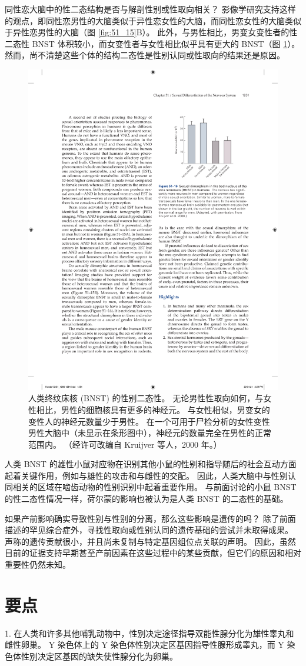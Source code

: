 同性恋大脑中的性二态结构是否与解剖性别或性取向相关？
影像学研究支持这样的观点，即同性恋男性的大脑类似于异性恋女性的大脑，而同性恋女性的大脑类似于异性恋男性的大脑（图 \ref{fig:51_15}B）。
此外，与男性相比，男变女变性者的性二态性 BNST 体积较小，而女变性者与女性相比似乎具有更大的 BNST（图 \ref{fig:51_16}）。
然而，尚不清楚这些个体的结构二态性是性别认同或性取向的结果还是原因。


\begin{figure}[htbp]
	\centering
	\includegraphics[width=0.4\linewidth]{chap51/fig_51_16}
	\caption{人类终纹床核 (BNST) 的性别二态性。 无论男性性取向如何，与女性相比，男性的细胞核具有更多的神经元。 与女性相似，男变女的变性人的神经元数量少于男性。 在一个可用于尸检分析的女性变性男性大脑中（未显示在条形图中），神经元的数量完全在男性的正常范围内。 （经许可改编自 Kruijver 等人，2000 年。）}
	\label{fig:51_16}
\end{figure}


人类 BNST 的雄性小鼠对应物在识别其他小鼠的性别和指导随后的社会互动方面起着关键作用，例如与雄性的攻击和与雌性的交配。
因此，人类大脑中与性别认同相关的区域在啮齿动物的性别识别中起着重要作用。
与前面讨论的小鼠 BNST 的性二态性情况一样，荷尔蒙的影响也被认为是人类 BNST 的二态性的基础。


如果产前影响确实导致性别与性别的分离，那么这些影响是遗传的吗？
除了前面描述的罕见综合症外，寻找性取向或性别认同的遗传基础的尝试并未取得成果。
声称的遗传贡献很小，并且尚未复制与特定基因组位点关联的声明。
因此，虽然目前的证据支持早期甚至产前因素在这些过程中的某些贡献，但它们的原因和相对重要性仍然未知。


\section{要点}

1. 在人类和许多其他哺乳动物中，性别决定途径指导双能性腺分化为雄性睾丸和雌性卵巢。
Y 染色体上的 Y 染色体性别决定区基因指导性腺形成睾丸，而 Y 染色体性别决定区基因的缺失使性腺分化为卵巢。 


